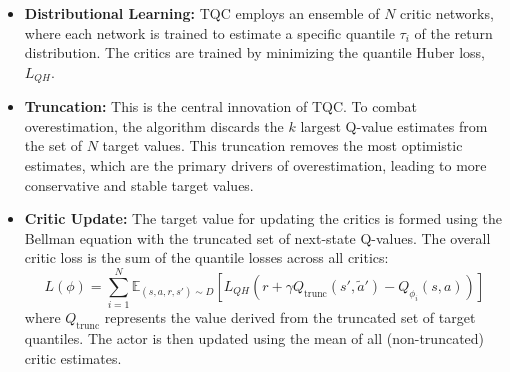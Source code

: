 \begin{itemize}
    \item \textbf{Distributional Learning:} TQC employs an ensemble of $N$ critic networks, where each network is trained to estimate a specific quantile $\tau_i$ of the return distribution. The critics are trained by minimizing the quantile Huber loss, $L_{QH}$.
    
    \item \textbf{Truncation:} This is the central innovation of TQC. To combat overestimation, the algorithm discards the $k$ largest Q-value estimates from the set of $N$ target values. This truncation removes the most optimistic estimates, which are the primary drivers of overestimation, leading to more conservative and stable target values.
    
    \item \textbf{Critic Update:} The target value for updating the critics is formed using the Bellman equation with the truncated set of next-state Q-values. The overall critic loss is the sum of the quantile losses across all critics:
    \[
    L(\phi) = \sum_{i=1}^{N} \mathbb{E}_{(s,a,r,s') \sim D} \left[ L_{QH}\left(r + \gamma Q_{\text{trunc}}(s', \tilde{a}') - Q_{\phi_i}(s,a) \right) \right]
    \]
    where $Q_{\text{trunc}}$ represents the value derived from the truncated set of target quantiles. The actor is then updated using the mean of all (non-truncated) critic estimates.
\end{itemize}